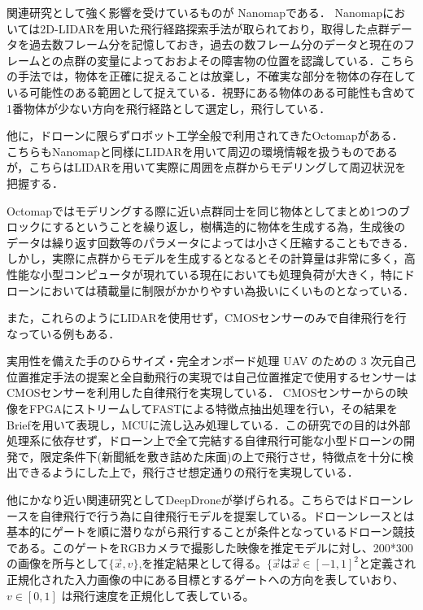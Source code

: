 \documentclass[uplatex,a4j,10pt]{jsarticle}
\begin{document}
関連研究として強く影響を受けているものが Nanomap\cite{Nanomap}である．
Nanomapにおいては2D-LIDARを用いた飛行経路探索手法が取られており，取得した点群データを過去数フレーム分を記憶しておき，過去の数フレーム分のデータと現在のフレームとの点群の変量によっておおよその障害物の位置を認識している．こちらの手法では，物体を正確に捉えることは放棄し，不確実な部分を物体の存在している可能性のある範囲として捉えている．視野にある物体のある可能性も含めて1番物体が少ない方向を飛行経路として選定し，飛行している．

他に，ドローンに限らずロボット工学全般で利用されてきたOctomap\cite{Octomap}がある．
こちらもNanomapと同様にLIDARを用いて周辺の環境情報を扱うものであるが，こちらはLIDARを用いて実際に周囲を点群からモデリングして周辺状況を把握する．

Octomapではモデリングする際に近い点群同士を同じ物体としてまとめ1つのブロックにするということを繰り返し，樹構造的に物体を生成する為，生成後のデータは繰り返す回数等のパラメータによっては小さく圧縮することもできる．
しかし，実際に点群からモデルを生成するとなるとその計算量は非常に多く，高性能な小型コンピュータが現れている現在においても処理負荷が大きく，特にドローンにおいては積載量に制限がかかりやすい為扱いにくいものとなっている．

また，これらのようにLIDARを使用せず，CMOSセンサーのみで自律飛行を行なっている例もある．

実用性を備えた手のひらサイズ・完全オンボード処理 UAV のための 3 次元自己位置推定手法の提案と全自動飛行の実現\cite{SfMDrone}では自己位置推定で使用するセンサーはCMOSセンサーを利用した自律飛行を実現している．
CMOSセンサーからの映像をFPGAにストリームしてFAST\cite{FAST}による特徴点抽出処理を行い，その結果をBrief\cite{Brief}を用いて表現し，MCUに流し込み処理している．この研究での目的は外部処理系に依存せず，ドローン上で全て完結する自律飛行可能な小型ドローンの開発で，限定条件下(新聞紙を敷き詰めた床面)の上で飛行させ，特徴点を十分に検出できるようにした上で，飛行させ想定通りの飛行を実現している．

他にかなり近い関連研究としてDeepDrone\cite{DeepDrone}が挙げられる。こちらではドローンレースを自律飛行で行う為に自律飛行モデルを提案している。ドローンレースとは基本的にゲートを順に潜りながら飛行することが条件となっているドローン競技である。このゲートをRGBカメラで撮影した映像を推定モデルに対し、200*300の画像を所与として$\lbrace \vec{x}, v \rbrace$,を推定結果として得る。$\lbrace \vec{x}$は$\vec{x} \in [-1,1]^2$と定義され正規化された入力画像の中にある目標とするゲートへの方向を表していおり、 $v \in [0,1]$ は飛行速度を正規化して表している。
\end{document}
